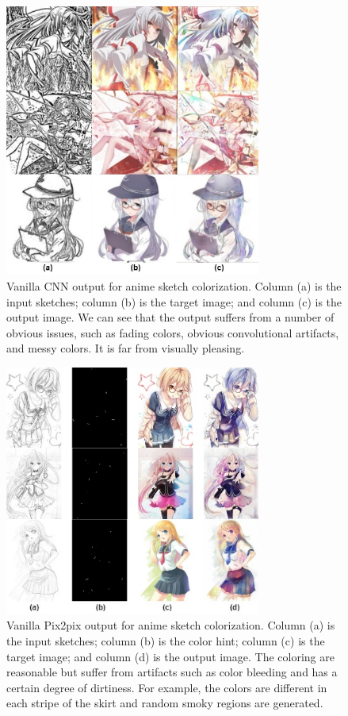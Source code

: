 \begin{figure}
    \centering
    \includegraphics[width=0.75\textwidth]{images/colorization/cnn.jpg}
    \caption{Vanilla CNN output for anime sketch colorization. Column (a) is the input sketches; column (b) is the target image; and column (c) is the output image.\cite{fransOutlineColorizationTandem2017} We can see that the output suffers from a number of obvious issues, such as fading colors, obvious convolutional artifacts, and messy colors. It is far from visually pleasing.} 
    \label{fig:colorization_cnn}
\end{figure}


\begin{figure}
    \centering
    \includegraphics[width=0.75\textwidth]{images/colorization/pix2pix.jpg}
    \caption{Vanilla Pix2pix output for anime sketch colorization. Column (a) is the input sketches; column (b) is the color hint; column (c) is the target image; and column (d) is the output image.\cite{steinsDeepLearningProject2022} The coloring are reasonable but suffer from artifacts such as color bleeding and has a certain degree of dirtiness. For example, the colors are different in each stripe of the skirt and random smoky regions are generated.} 
    \label{fig:colorization_pix2pix}
\end{figure}



